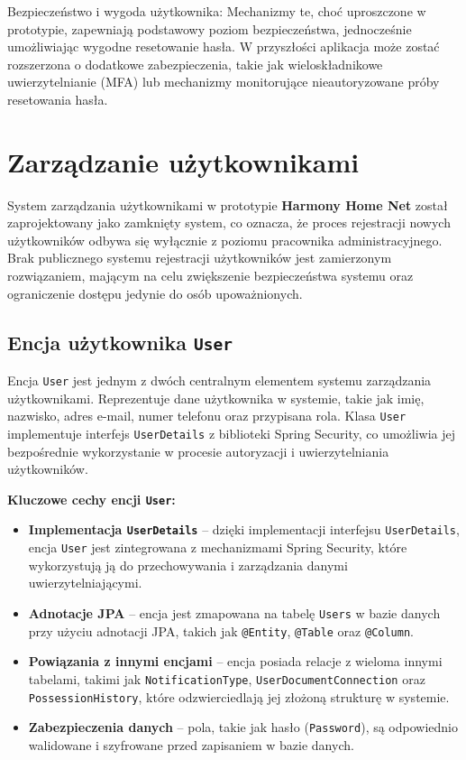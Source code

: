 Bezpieczeństwo i wygoda użytkownika: 
Mechanizmy te, choć uproszczone w prototypie, zapewniają podstawowy poziom bezpieczeństwa, jednocześnie umożliwiając wygodne resetowanie hasła. W przyszłości aplikacja może zostać rozszerzona o dodatkowe zabezpieczenia, takie jak wieloskładnikowe uwierzytelnianie (MFA) lub mechanizmy monitorujące nieautoryzowane próby resetowania hasła.


\section{Zarządzanie użytkownikami}

System zarządzania użytkownikami w prototypie \textbf{Harmony Home Net} został zaprojektowany jako zamknięty system, co oznacza, że proces rejestracji nowych użytkowników odbywa się wyłącznie z poziomu pracownika administracyjnego. Brak publicznego systemu rejestracji użytkowników jest zamierzonym rozwiązaniem, mającym na celu zwiększenie bezpieczeństwa systemu oraz ograniczenie dostępu jedynie do osób upoważnionych. 

\subsection{Encja użytkownika \texttt{User}}

Encja \texttt{User} jest jednym z dwóch centralnym elementem systemu zarządzania użytkownikami. Reprezentuje dane użytkownika w systemie, takie jak imię, nazwisko, adres e-mail, numer telefonu oraz przypisana rola. Klasa \texttt{User} implementuje interfejs \texttt{UserDetails} z biblioteki Spring Security, co umożliwia jej bezpośrednie wykorzystanie w procesie autoryzacji i uwierzytelniania użytkowników.

\textbf{Kluczowe cechy encji \texttt{User}:}
\begin{itemize}
    \item \textbf{Implementacja \texttt{UserDetails}} -- dzięki implementacji interfejsu \texttt{UserDetails}, encja \texttt{User} jest zintegrowana z mechanizmami Spring Security, które wykorzystują ją do przechowywania i zarządzania danymi uwierzytelniającymi.
    \item \textbf{Adnotacje JPA} -- encja jest zmapowana na tabelę \texttt{Users} w bazie danych przy użyciu adnotacji JPA, takich jak \texttt{@Entity}, \texttt{@Table} oraz \texttt{@Column}.
    \item \textbf{Powiązania z innymi encjami} -- encja posiada relacje z wieloma innymi tabelami, takimi jak \texttt{NotificationType}, \texttt{UserDocumentConnection} oraz \texttt{PossessionHistory}, które odzwierciedlają jej złożoną strukturę w systemie.
    \item \textbf{Zabezpieczenia danych} -- pola, takie jak hasło (\texttt{Password}), są odpowiednio walidowane i szyfrowane przed zapisaniem w bazie danych.
\end{itemize}

